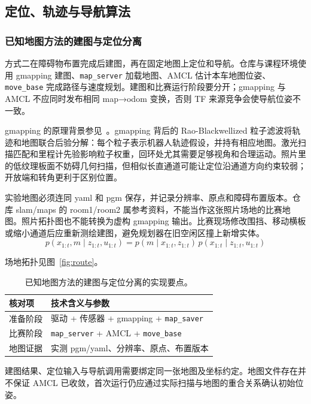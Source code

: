 \subsection{定位、轨迹与导航算法}
\subsubsection{已知地图方法的建图与定位分离}
方式二在障碍物布置完成后建图，再在固定地图上定位和导航。仓库与课程环境使用 gmapping 建图、\texttt{map\_\allowbreak server} 加载地图、AMCL 估计本车地图位姿、\texttt{move\_\allowbreak base} 完成路径与速度规划。建图和比赛运行阶段要分开；gmapping 与 AMCL 不应同时发布相同 map→odom 变换，否则 TF 来源竞争会使导航位姿不一致。

gmapping 的原理背景参见~\cite{gmapping}。gmapping 背后的 Rao-Blackwellized 粒子滤波将轨迹和地图联合后验分解：每个粒子表示机器人轨迹假设，并持有相应地图。激光扫描匹配和里程计先验影响粒子权重，回环处尤其需要足够视角和合理运动。照片里的低纹理板面不妨碍几何扫描，但相似长直通道可能让定位沿通道方向约束较弱；开放端和转角更利于区别位置。

实验地图必须连同 yaml 和 pgm 保存，并记录分辨率、原点和障碍布置版本。仓库 slam/maps 的 room1/room2 属参考资料，不能当作这张照片场地的比赛地图。照片拓扑图也不能转换为虚构 gmapping 输出。比赛现场修改围挡、移动横板或缩小通道后应重新测绘建图，避免规划器在旧空闲区撞上新增实体。
\begin{equation}
p(x_{1:t},m\mid z_{1:t},u_{1:t})=p(m\mid x_{1:t},z_{1:t})\,p(x_{1:t}\mid z_{1:t},u_{1:t})
\end{equation}
\par 场地拓扑见图~\ref{fig:route}。
\begin{table}[H]\centering\small
\begin{tabularx}{\linewidth}{p{27mm}X}\toprule
核对项 & 技术含义与参数\\\midrule
准备阶段 & 驱动 + 传感器 + gmapping + \texttt{map\_\allowbreak saver}\\
比赛阶段 & \texttt{map\_\allowbreak server} + AMCL + \texttt{move\_\allowbreak base}\\
地图证据 & 实测 pgm/yaml、分辨率、原点、布置版本\\
\bottomrule\end{tabularx}
\caption{已知地图方法的建图与定位分离的实现要点。}\end{table}

建图结果、定位输入与导航调用需要绑定同一张地图及坐标约定。地图文件存在并不保证 AMCL 已收敛，首次运行仍应通过实际扫描与地图的重合关系确认初始位姿。

